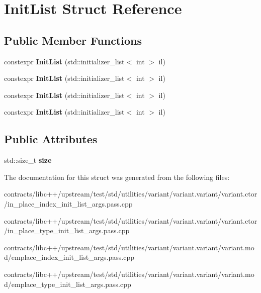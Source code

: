 \hypertarget{struct_init_list}{}\section{Init\+List Struct Reference}
\label{struct_init_list}
\subsection*{Public Member Functions}
\begin{DoxyCompactItemize}
\item 
\mbox{\label{struct_init_list_a4ccb5c7811457a8935d284ce0747cadc}} 
constexpr {\bfseries Init\+List} (std\+::initializer\+\_\+list$<$ int $>$ il)
\item 
\mbox{\label{struct_init_list_a4ccb5c7811457a8935d284ce0747cadc}} 
constexpr {\bfseries Init\+List} (std\+::initializer\+\_\+list$<$ int $>$ il)
\item 
\mbox{\label{struct_init_list_a4ccb5c7811457a8935d284ce0747cadc}} 
constexpr {\bfseries Init\+List} (std\+::initializer\+\_\+list$<$ int $>$ il)
\item 
\mbox{\label{struct_init_list_a4ccb5c7811457a8935d284ce0747cadc}} 
constexpr {\bfseries Init\+List} (std\+::initializer\+\_\+list$<$ int $>$ il)
\end{DoxyCompactItemize}
\subsection*{Public Attributes}
\begin{DoxyCompactItemize}
\item 
\mbox{\label{struct_init_list_ad7483315bd1f38623b934c98a1d38804}} 
std\+::size\+\_\+t {\bfseries size}
\end{DoxyCompactItemize}


The documentation for this struct was generated from the following files\+:\begin{DoxyCompactItemize}
\item 
contracts/libc++/upstream/test/std/utilities/variant/variant.\+variant/variant.\+ctor/in\+\_\+place\+\_\+index\+\_\+init\+\_\+list\+\_\+args.\+pass.\+cpp\item 
contracts/libc++/upstream/test/std/utilities/variant/variant.\+variant/variant.\+ctor/in\+\_\+place\+\_\+type\+\_\+init\+\_\+list\+\_\+args.\+pass.\+cpp\item 
contracts/libc++/upstream/test/std/utilities/variant/variant.\+variant/variant.\+mod/emplace\+\_\+index\+\_\+init\+\_\+list\+\_\+args.\+pass.\+cpp\item 
contracts/libc++/upstream/test/std/utilities/variant/variant.\+variant/variant.\+mod/emplace\+\_\+type\+\_\+init\+\_\+list\+\_\+args.\+pass.\+cpp\end{DoxyCompactItemize}
